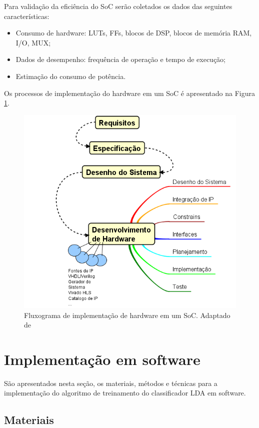 Para validação da eficiência do SoC serão coletados os dados das seguintes características:
\begin{itemize}
	\item Consumo de hardware: LUTs, FFs, blocos de DSP, blocos de memória RAM, I/O, MUX;
	\item Dados de desempenho: frequência de operação e tempo de execução;
	\item Estimação do consumo de potência.
\end{itemize}

Os processos de implementação do hardware em um SoC é apresentado na Figura \ref{diagram_hardware}.

\begin{figure}[h]
	\centering
	\includegraphics[keepaspectratio=true,scale=1.0]{figuras/fluxograma_hardware.PNG}
	\caption{Fluxograma de implementação de hardware em um SoC. Adaptado de \cite{zynqBook}}
	\label{diagram_hardware}
\end{figure}

\section{Implementação em software}
São apresentados nesta seção, os materiais, métodos e técnicas para a implementação do
algoritmo de treinamento do classificador LDA em software.

\subsection{Materiais}

